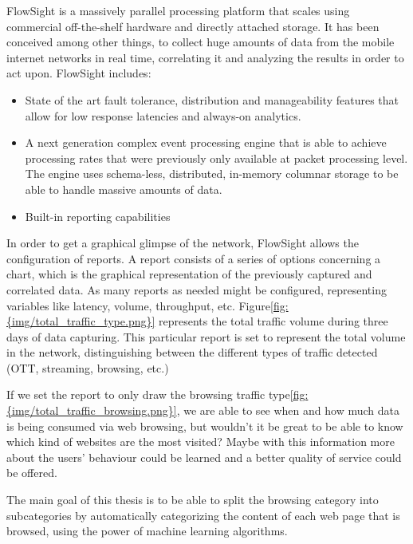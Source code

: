 
FlowSight is a massively parallel processing platform that scales using commercial off-the-shelf hardware and directly attached storage. It has been conceived among other things, to collect
huge amounts of data from the mobile internet networks in real time, correlating it and analyzing the results in order to act upon. FlowSight includes:
\begin{itemize}
  \item{State of the art fault tolerance, distribution and manageability features that allow for low response latencies and always-on analytics.}
  \item{A next generation complex event processing engine that is able to achieve processing rates that were previously only available at packet processing level. The engine uses schema-less, 
        distributed, in-memory columnar storage to be able to handle massive amounts of data.}
  \item{Built-in reporting capabilities}
\end{itemize}
In order to get a graphical glimpse of the network, FlowSight allows the configuration of reports. A report consists of a series of options concerning a chart, which is the graphical representation
of the previously captured and correlated data. As many reports as needed might be configured, representing variables like latency, volume, throughput, etc.   
Figure\ref{fig:{img/total_traffic_type.png}} represents the total traffic volume during three days of data capturing. This particular report is set to represent the total volume in the network, 
distinguishing between the different types of traffic detected (OTT, streaming, browsing, etc.)

If we set the report to only draw the browsing traffic type\ref{fig:{img/total_traffic_browsing.png}}, we are able to see when and how much data is being consumed via web browsing, but wouldn't it be 
great to be able to know which kind of websites are the most visited? Maybe with this information more about the users' behaviour could be learned and a better quality of service could be offered.


The main goal of this thesis is to be able to split the browsing category into subcategories by automatically categorizing the content of each web page that is browsed, using the power of machine learning
algorithms.

